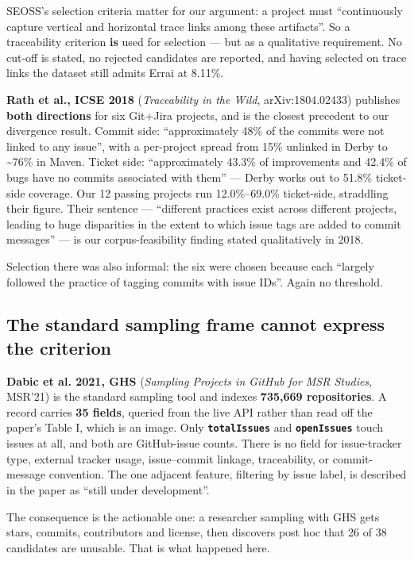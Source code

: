 \documentclass[sigconf,review,anonymous]{acmart}
\begin{document}
SEOSS's selection criteria matter for our argument: a project must ``continuously capture vertical and horizontal trace links among these artifacts''. So a traceability criterion \textbf{is} used for selection --- but as a qualitative requirement. No cut-off is stated, no rejected candidates are reported, and having selected on trace links the dataset still admits Errai at 8.11\%.

\textbf{Rath et al., ICSE 2018} \cite{rath2018traceability} (\emph{Traceability in the Wild}, arXiv:1804.02433) publishes \textbf{both directions} for six Git+Jira projects, and is the closest precedent to our divergence result. Commit side: ``approximately 48\% of the commits were not linked to any issue'', with a per-project spread from 15\% unlinked in Derby to \textasciitilde{}76\% in Maven. Ticket side: ``approximately 43.3\% of improvements and 42.4\% of bugs have no commits associated with them'' --- Derby works out to 51.8\% ticket-side coverage. Our 12 passing projects run 12.0\%--69.0\% ticket-side, straddling their figure. Their sentence --- ``different practices exist across different projects, leading to huge disparities in the extent to which issue tags are added to commit messages'' --- is our corpus-feasibility finding stated qualitatively in 2018.

Selection there was also informal: the six were chosen because each ``largely followed the practice of tagging commits with issue IDs''. Again no threshold.

\subsection{The standard sampling frame cannot express the criterion}
\label{sec:2.3}

\textbf{Dabic et al. 2021, GHS} \cite{dabic2021sampling} (\emph{Sampling Projects in GitHub for MSR Studies}, MSR'21) is the standard sampling tool and indexes \textbf{735,669 repositories}. A record carries \textbf{35 fields}, queried from the live API rather than read off the paper's Table I, which is an image. Only \textbf{\texttt{totalIssues}} and \textbf{\texttt{openIssues}} touch issues at all, and both are GitHub-issue counts. There is no field for issue-tracker type, external tracker usage, issue--commit linkage, traceability, or commit-message convention. The one adjacent feature, filtering by issue label, is described in the paper as ``still under development''.

The consequence is the actionable one: a researcher sampling with GHS gets stars, commits, contributors and license, then discovers post hoc that 26 of 38 candidates are unusable. That is what happened here.
\end{document}
